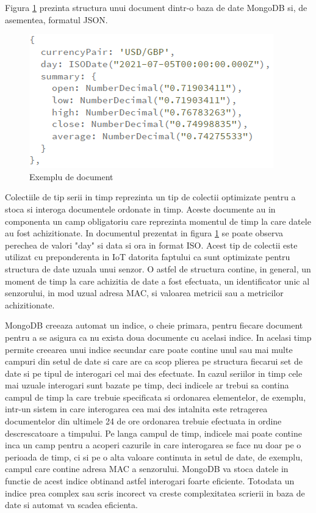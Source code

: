 Figura \ref{fig:MongoDBDocument} prezinta structura unui document dintr-o baza de date MongoDB si, de asementea, formatul JSON.
\begin{figure}[H]
    \centering
    \includegraphics[scale=0.8]{figs/mongoDBDocument.png}
    \caption{Exemplu de document \cite{mongoDB}}
    \label{fig:MongoDBDocument}
\end{figure}

Colectiile de tip serii in timp reprezinta un tip de colectii optimizate pentru a stoca si interoga documentele ordonate in timp. Aceste documente au in 
componenta un camp obligatoriu care reprezinta momentul de timp la care datele au fost achizitionate. In documentul prezentat in figura \ref{fig:MongoDBDocument} 
se poate observa perechea de valori "day" si data si ora in format ISO. Acest tip de colectii este utilizat cu preponderenta in IoT datorita faptului ca sunt 
optimizate pentru structura de date uzuala unui senzor. O astfel de structura contine, in general, un moment de timp la care achizitia de date a fost efectuata, 
un identificator unic al senzorului, in mod uzual adresa MAC, si valoarea metricii sau a metricilor achizitionate.

MongoDB creeaza automat un indice, o cheie primara, pentru fiecare document pentru a se asigura ca nu exista doua documente cu acelasi indice. In acelasi timp 
permite creearea unui indice secundar care poate contine unul sau mai multe campuri din setul de date si care are ca scop plierea pe structura fiecarui set de date 
si pe tipul de interogari cel mai des efectuate. In cazul seriilor in timp cele mai uzuale interogari sunt bazate pe timp, deci indicele ar trebui sa contina campul 
de timp la care trebuie specificata si ordonarea elementelor, de exemplu, intr-un sistem in care interogarea cea mai des intalnita este retragerea documentelor 
din ultimele 24 de ore ordonarea trebuie efectuata in ordine descrescatoare a timpului. Pe langa campul de timp, indicele mai poate contine inca un camp pentru 
a acoperi cazurile in care interogarea se face nu doar pe o perioada de timp, ci si pe o alta valoare continuta in setul de date, de exemplu, campul care contine 
adresa MAC a senzorului. MongoDB va stoca datele in functie de acest indice obtinand astfel interogari foarte eficiente. Totodata un indice prea complex sau 
scris incorect va creste complexitatea scrierii in baza de date si automat va scadea eficienta.
